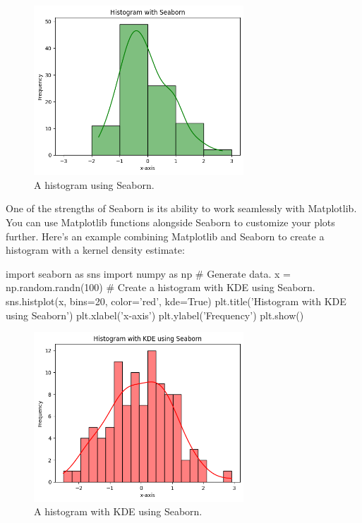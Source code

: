 \begin{figure}[H]
    \centering
    \includegraphics[width=0.7\textwidth]{assets/fig4_mpl.png}
    \caption{A histogram using Seaborn.}
\end{figure}

One of the strengths of Seaborn is its ability to work seamlessly with Matplotlib. You can use
Matplotlib functions alongside Seaborn to customize your plots further. Here's an example
combining Matplotlib and Seaborn to create a histogram with a kernel density estimate:

\begin{codeblock}[language=python]
    import seaborn as sns
    import numpy as np
    # Generate data.
    x = np.random.randn(100)
    # Create a histogram with KDE using Seaborn.
    sns.histplot(x, bins=20, color='red', kde=True)
    plt.title('Histogram with KDE using Seaborn')
    plt.xlabel('x-axis')
    plt.ylabel('Frequency')
    plt.show()
\end{codeblock}

\begin{figure}[H]
    \centering
    \includegraphics[width=0.7\textwidth]{assets/fig5_mpl.png}
    \caption{A histogram with KDE using Seaborn.}
\end{figure}

